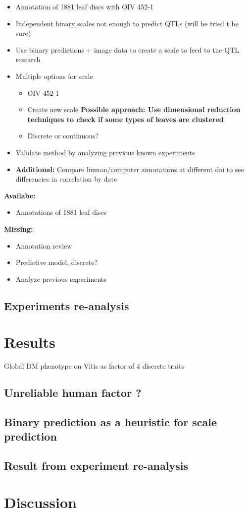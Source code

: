 \documentclass[english]{article}
\begin{document}
\begin{itemize}
	\item Annotation of 1881 leaf discs with OIV 452-1
	\item Independent binary scales not enough to predict QTLs (will be tried t be sure)
	\item Use binary predictions + image data to create a scale to feed to the QTL research
	\item Multiple options for scale
	      \begin{itemize}
		      \item OIV 452-1
		      \item Create new scale \textbf{Possible approach: Use dimensional reduction techniques to check if some types of leaves are clustered}
		      \item Discrete or continuous?
	      \end{itemize}
	\item Validate method by analyzing previous known experiments
	\item \textbf{Additional:} Compare human/computer annotations at different dai to see differencies in correlation by date
\end{itemize}

\textbf{Availabe:}
\begin{itemize}
	\item Annotations of 1881 leaf discs
\end{itemize}
\textbf{Missing:}
\begin{itemize}
	\item Annotation review
	\item Predictive model, discrete?
	\item Analyze previous experiments
\end{itemize}

\subsection{Experiments re-analysis}

\section{Results}

Global DM phenotype on Vitis as factor of 4 discrete traits



\subsection{Unreliable human factor \textbf{?}}

\subsection{Binary prediction as a heuristic for scale prediction}

\subsection{Result from experiment re-analysis}

\section{Discussion}



\printbibliography
\end{document}
